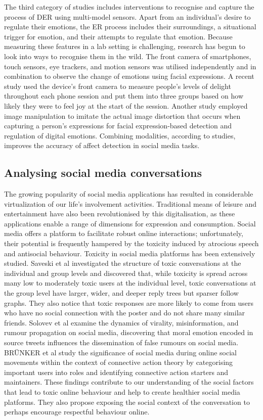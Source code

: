 \documentclass[acmtog]{acmart}
\begin{document}
The third category of studies includes interventions to recognise and capture the process of DER using multi-model sensors. Apart from an individual's desire to regulate their emotions, the ER process includes their surroundings, a situational trigger for emotion, and their attempts to regulate that emotion. Because measuring these features in a lab setting is challenging, research has begun to look into ways to recognise them in the wild. The front camera of smartphones, touch sensors, eye trackers, and motion sensors was utilised independently and in combination to observe the change of emotions using facial expressions. A recent study used the device's front camera to measure people's levels of delight throughout each phone session and put them into three groups based on how likely they were to feel joy at the start of the session. Another study employed image manipulation to imitate the actual image distortion that occurs when capturing a person's expressions for facial expression-based detection and regulation of digital emotions. Combining modalities, according to studies, improves the accuracy of affect detection in social media tasks.







\subsection{Analysing social media conversations}
The growing popularity of social media applications has resulted in considerable virtualization of our life's involvement activities. Traditional means of leisure and entertainment have also been revolutionised by this digitalisation, as these applications enable a range of dimensions for expression and consumption. Social media offers a platform to facilitate robust online interactions; unfortunately, their potential is frequently hampered by the toxicity induced by atrocious speech and antisocial behaviour. Toxicity in social media platforms has been extensively studied. Saveski et al investigated the structure of toxic conversations at the individual and group levels and discovered that, while toxicity is spread across many low to moderately toxic users at the individual level, toxic conversations at the group level have larger, wider, and deeper reply trees but sparser follow graphs. They also notice that toxic responses are more likely to come from users who have no social connection with the poster and do not share many similar friends. Solovev et al examine the dynamics of virality, misinformation, and rumour propagation on social media, discovering that moral emotion encoded in source tweets influences the dissemination of false rumours on social media. BRÜNKER et al study the significance of social media during online social movements within the context of connective action theory by categorising important users into roles and identifying connective action starters and maintainers. These findings contribute to our understanding of the social factors that lead to toxic online behaviour and help to create healthier social media platforms. They also propose exposing the social context of the conversation to perhaps encourage respectful behaviour online.
\end{document}
